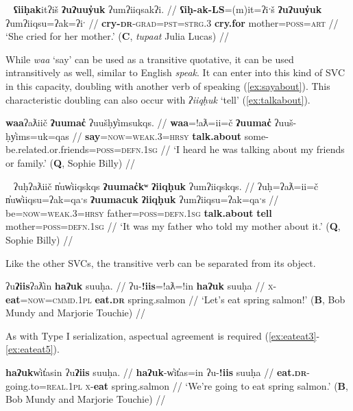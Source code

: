 \ex~ \label{ex:crycry}
\begingl
\glpreamble \textbf{ʕiiḥak}itʔiš \textbf{ʔuʔuuy̓uk} ʔumʔiiqsakʔi. //
\gla \textbf{ʕiḥ-ak-LS}=(m)it=ʔiˑš \textbf{ʔuʔuuy̓uk} ʔumʔiiqsu=ʔak=ʔiˑ //
\glb \textbf{cry-\textsc{dr}}-\textsc{grad}=\textsc{pst}=\textsc{strg.3} \textbf{cry.for} mother=\textsc{poss}=\textsc{art} //
\glft `She cried for her mother.' (\textbf{C}, \textit{tupaat} Julia Lucas) //
\endgl
\xe

While \textit{waa} `say' can be used as a transitive quotative, it can be used intransitively as well, similar to English \textit{speak}. It can enter into this kind of SVC in this capacity, doubling with another verb of speaking (\ref{ex:sayabout}). This characteristic doubling can also occur with \textit{ʔiiqḥuk} `tell' (\ref{ex:talkabout}).

\ex \label{ex:sayabout}
\begingl
\glpreamble \textbf{waa}ʔaƛiič \textbf{ʔuumac̓} ʔuušḥy̓imsukqs. //
\gla \textbf{waa}=!aƛ=ii=č \textbf{ʔuumac̓} ʔuuš-ḥy̓ims=uk=qas //
\glb \textbf{say}=\textsc{now}=\textsc{weak.3}=\textsc{hrsy} \textbf{talk.about} some-be.related.or.friends=\textsc{poss}=\textsc{defn.1sg} //
\glft `I heard he was talking about my friends or family.' (\textbf{Q}, Sophie Billy) //
\endgl
\xe

\ex~ \label{ex:talkabout}
\begingl
\glpreamble ʔuḥʔaƛiič n̓uw̓iiqskqs \textbf{ʔuumac̓kʷ} \textbf{ʔiiqḥuk} ʔumʔiiqskqs. //
\gla ʔuḥ=ʔaƛ=ii=č n̓uw̓iiqsu=ʔak=qaˑs \textbf{ʔuumacuk} \textbf{ʔiiqḥuk} ʔumʔiiqsu=ʔak=qaˑs //
\glb be=\textsc{now}=\textsc{weak.3}=\textsc{hrsy} father=\textsc{poss}=\textsc{defn.1sg} \textbf{talk.about} \textbf{tell} mother=\textsc{poss}=\textsc{defn.1sg} //
\glft `It was my father who told my mother about it.' (\textbf{Q}, Sophie Billy) //
\endgl
\xe

Like the other SVCs, the transitive verb can be separated from its object.

\ex \label{ex:eateat2}
\begingl
\glpreamble ʔu\textbf{ʔiis}ʔaƛ̓in \textbf{haʔuk} suuḥa. //
\gla ʔu-\textbf{!iis}=!aƛ=!in \textbf{haʔuk} suuḥa //
\glb \textsc{x}-\textbf{eat}=\textsc{now}=\textsc{cmmd.1pl} \textbf{eat.\textsc{dr}} spring.salmon //
\glft `Let's eat spring salmon!' (\textbf{B}, Bob Mundy and Marjorie Touchie) //
\endgl
\xe

As with Type I serialization, aspectual agreement is required (\ref{ex:eateat3}-\ref{ex:eateat5}).

\ex \label{ex:eateat3}
\begingl
\glpreamble \textbf{haʔuk}w̓it̓asin ʔu\textbf{ʔiis} suuḥa. //
\gla \textbf{haʔuk}-w̓it̓as=in ʔu-\textbf{!iis} suuḥa //
\glb \textbf{eat.\textsc{dr}}-going.to=\textsc{real.1pl} \textsc{x}-\textbf{eat} spring.salmon //
\glft `We're going to eat spring salmon.' (\textbf{B}, Bob Mundy and Marjorie Touchie) //
\endgl
\xe

